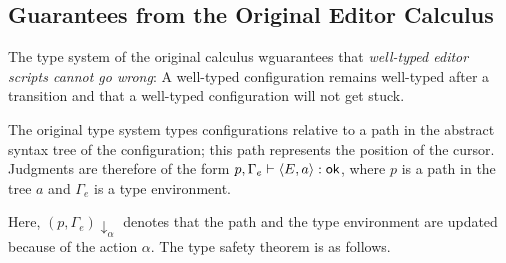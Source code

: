 \documentclass[sigplan,screen]{acmart}
\begin{document}

\subsection{Guarantees from the Original Editor Calculus}

The type system of the original calculus
\cite{type_safe_structure_editor} wguarantees that \emph{well-typed
  editor scripts cannot go wrong}: A well-typed configuration remains
well-typed after a transition and that a well-typed configuration will
not get stuck.

The original type system types configurations relative to a
path in the abstract syntax tree of the configuration; this path
represents the position of the cursor. Judgments are therefore of the
form $p, \Gamma_e \vdash \langle E,a \rangle : \textsf{ok}$, where $p$ is a path
in the tree $a$ and $\Gamma_e$ is a type environment.

Here, $(p,\Gamma_e)\downarrow_\alpha$ denotes that the path and the
type environment are updated because of the action $\alpha$. The type
safety theorem is as follows.
\end{document}
